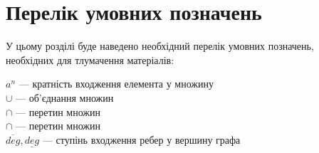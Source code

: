 \chapter*{Перелік умовних позначень}

У цьому розділі буде наведено необхідний перелік умовних позначень, необхідних для тлумачення матеріалів:
\begin{center}
$a^n$ --- кратність входження елемента у множину
\\
$\cup$ --- об'єднання множин
\\
$\cap$ --- перетин множин
\\
$\cap$ --- перетин множин
\\
$\overline{deg},\underline{deg}$ --- ступінь входження ребер у вершину графа
\end{center}



